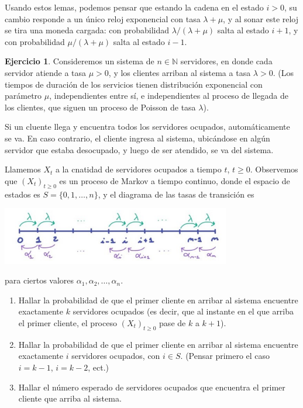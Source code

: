 \documentclass{article}
\newcommand{\naturalnum}{\mathbb{N}}
\theoremstyle{definition}
\newtheorem{exercise}{Ejercicio}
\begin{document}
Usando estos lemas, podemos pensar que estando la cadena en el estado \(i > 0\), su cambio responde a un único reloj exponencial con tasa \(\lambda + \mu\), y al sonar este reloj se tira una moneda cargada:
con probabilidad \(\lambda / (\lambda + \mu)\) salta al estado \(i + 1\), y con probabilidad \(\mu / (\lambda + \mu)\) salta al estado \(i - 1\).

\begin{exercise}
Consideremos un sistema de $n \in \naturalnum$ servidores, en donde cada servidor atiende a tasa $\mu > 0$, y los clientes arriban al sistema a tasa $\lambda > 0$.
(Los tiempos de duración de los servicios tienen distribución exponencial con parámetro $\mu$, independientes entre sí, e independientes al proceso de llegada de los clientes, que siguen un proceso de Poisson de tasa $\lambda$).

Si un cluente llega y encuentra todos los servidores ocupados, automáticamente se va.
En caso contrario, el cliente ingresa al sistema, ubicándose en algún servidor que estaba desocupado, y luego de ser atendido, se va del sistema.

Llamemos $X_t$ a la cnatidad de servidores ocupados a tiempo $t$, $t \geq 0$.
Observemos que $(X_t)_{t \geq 0}$ es un proceso de Markov a tiempo continuo, donde el espacio de estados es $S = \{0, 1, \dots, n\}$, y el diagrama de las tasas de transición es
\begin{center}
\includegraphics[width=0.75\textwidth]{diagrama_de_las_tasas_de_transicion}
\end{center}
para ciertos valores $\alpha_1, \alpha_2, \dots, \alpha_n$.
\begin{enumerate}[label=\roman*.]
	\item Hallar la probabilidad de que el primer cliente en arribar al sistema encuentre exactamente $k$ servidores ocupados (es decir, que al instante en el que arriba el primer cliente, el proceso $(X_t)_{t \geq 0}$ pase de $k$ a $k + 1$).
	\item Hallar la probabilidad de que el primer cliente en arribar al sistema encuentre exactamente $i$ servidores ocupados, con $i \in S$.
(Pensar primero el caso $i = k - 1$, $i = k - 2$, ect.)
	\item Hallar el número esperado de servidores ocupados que encuentra el primer cliente que arriba al sistema.
\end{enumerate}
\end{exercise}
\end{document}
